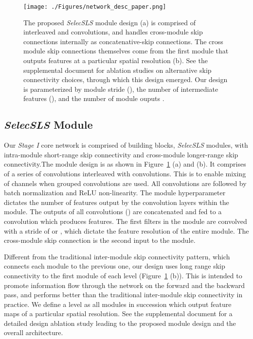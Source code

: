 \documentclass[acmtog,authorversion]{acmart}
\begin{document}
\begin{figure}[t]
  \texttt{[image: ./Figures/network\_desc\_paper.png]}
  \caption
  {The proposed \textit{SelecSLS} module design (a) is comprised of interleaved  and  convolutions, and handles cross-module skip connections internally as concatenative-skip connections. The cross module skip connections themselves come from the first module that outputs features at a particular spatial resolution (b). See the supplemental document for ablation studies on alternative skip connectivity choices, through which this design emerged. Our design is parameterized by module stride (), the number of intermediate features (), and the number of module ouputs .}
  \label{fig:network_module}
  \vspace{-0.3cm}
\end{figure}


\subsection{\textit{SelecSLS} Module}
Our \textit{Stage I} core network is comprised of building blocks, \textit{SelecSLS} modules, with intra-module short-range skip connectivity and cross-module longer-range skip connectivity.The module design is as shown in Figure~\ref{fig:network_module} (a) and (b). It comprises of a series of  convolutions interleaved with  convolutions. This is to enable mixing of channels when grouped  convolutions are used. All convolutions are followed by batch normalization and ReLU non-linearity. The module hyperparameter  dictates the number of features output by the convolution layers within the module. The outputs of all  convolutions () are concatenated and fed to a  convolution which produces  features. The first  filters in the module are convolved with a stride of  or , which dictate the feature resolution of the entire module. 
The cross-module skip connection is the second input to the module. 


Different from the traditional inter-module skip connectivity pattern, which connects each module to the previous one, our design uses long range skip connectivity to the first module of each level (Figure~\ref{fig:network_module} (b)). This is intended to promote information flow through the network on the forward and the backward pass, and performs better than the traditional inter-module skip connectivity in practice. 
We define a level as all modules in succession which output feature maps of a particular spatial resolution. 
See the supplemental document for a detailed design ablation study leading to the proposed module design and the overall architecture.
\end{document}
